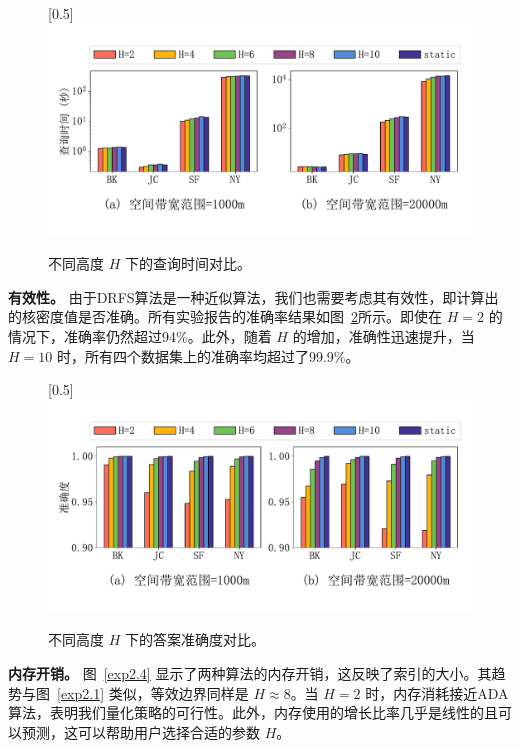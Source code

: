 \begin{figure}[h]\centering
	\vspace{-1em}
	\scalebox{0.5}[0.5]{\includegraphics{./figures/EXP_H_RunningTime_zh.pdf}}
	\vspace{-1em}
	\caption{不同高度 $H$ 下的查询时间对比。}
	\label{exp2.2}
\end{figure}

\textbf{有效性。} 由于DRFS算法是一种近似算法，我们也需要考虑其有效性，即计算出的核密度值是否准确。所有实验报告的准确率结果如图~\ref{exp2.3}所示。即使在 $H=2$ 的情况下，准确率仍然超过94\%。此外，随着 $H$ 的增加，准确性迅速提升，当 $H=10$ 时，所有四个数据集上的准确率均超过了99.9\%。

\begin{figure}[h]\centering
	\scalebox{0.5}[0.5]{\includegraphics{./figures/EXP_H_Accuracy_zh.pdf}}
	\vspace{-1em}
	\caption{不同高度 $H$ 下的答案准确度对比。}
	\label{exp2.3}
\end{figure}

\textbf{内存开销。}  图~\ref{exp2.4} 显示了两种算法的内存开销，这反映了索引的大小。其趋势与图~\ref{exp2.1} 类似，等效边界同样是 $H \approx 8$。当 $H=2$ 时，内存消耗接近ADA算法，表明我们量化策略的可行性。此外，内存使用的增长比率几乎是线性的且可以预测，这可以帮助用户选择合适的参数 $H$。

